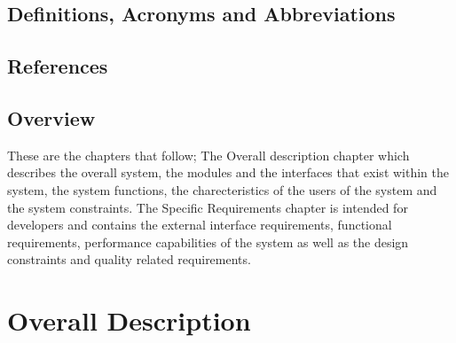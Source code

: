 \documentclass[11pt, a4paper]{article}
\begin{document}
	\subsection{Definitions,  Acronyms and Abbreviations}
	

	\subsection{References}


	\subsection{Overview}
		These are the chapters that follow; The Overall description chapter which describes the overall system,  the modules and the interfaces that exist within the system,  the system functions,  the charecteristics of the users of the system and the system constraints. The Specific Requirements chapter is intended for developers and contains the external interface requirements,  			functional requirements,  performance capabilities of the system as well as the design constraints and quality related requirements.

\newpage
\section{Overall Description}
\end{document}
